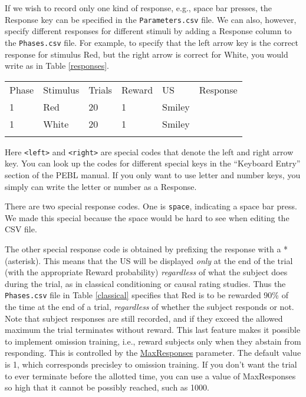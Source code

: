 \documentclass[11pt,]{article}
\renewcommand{\medskip}{}
\begin{document}
If we wish to record only one kind of response, e.g., space bar presses,
the Response key can be specified in the \texttt{Parameters.csv} file.
We can also, however, specify different responses for different stimuli
by adding a Response column to the \texttt{Phases.csv} file. For
example, to specify that the left arrow key is the correct response for
stimulus Red, but the right arrow is correct for White, you would write
as in Table \ref{responses}.

\begin{table*}[t]\begin{center}\small\begin{tabular}{@{}llllll@{}}
\hline\noalign{\medskip}
Phase & Stimulus & Trials & Reward & US & Response
\\\noalign{\medskip}
\hline\noalign{\medskip}
1 & Red & 20 & 1 & Smiley &
\\\noalign{\medskip}
1 & White & 20 & 1 & Smiley &
\\\noalign{\medskip}
\hline
\noalign{\medskip}
\end{tabular}\caption{A \texttt{Phases.csv} specifying different responses for
stimuli Red and White. \label{responses}}
\end{center}\end{table*}

Here \texttt{\textless{}left\textgreater{}} and
\texttt{\textless{}right\textgreater{}} are special codes that denote
the left and right arrow key. You can look up the codes for different
special keys in the ``Keyboard Entry'' section of the PEBL manual. If
you only want to use letter and number keys, you simply can write the
letter or number as a Response.

There are two special response codes. One is \texttt{space}, indicating
a space bar press. We made this special because the space would be hard
to see when editing the CSV file.

The other special response code is obtained by prefixing the response
with a * (asterisk). This means that the US will be displayed
\emph{only} at the end of the trial (with the appropriate Reward
probability) \emph{regardless} of what the subject does during the
trial, as in classical conditioning or causal rating studies. Thus the
\texttt{Phases.csv} file in Table \ref{classical} specifies that Red is
to be rewarded 90\% of the time at the end of a trial, \emph{regardless}
of whether the subject responds or not. Note that subject responses are
still recorded, and if they exceed the allowed maximum the trial
terminates without reward. This last feature makes it possible to
implement omission training, i.e., reward subjects only when they
abstain from responding. This is controlled by the
\hyperref[maxresponses]{MaxResponses} parameter. The default value is 1,
which corresponds precisley to omission training. If you don't want the
trial to ever terminate before the allotted time, you can use a value of
MaxResponses so high that it cannot be possibly reached, such as 1000.
\end{document}
